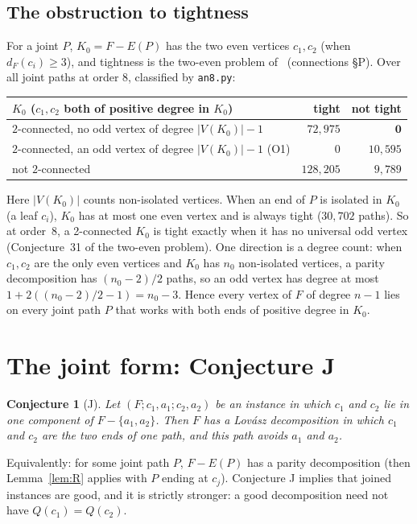 \documentclass[11pt]{amsart}
\newtheorem{conjecture}[theorem]{Conjecture}
\theoremstyle{definition}
\begin{document}
\subsection*{The obstruction to tightness}
For a joint $P$, $K_0=F-E(P)$ has the two even vertices $c_1,c_2$ (when $d_F(c_i)\ge3$), and tightness is
the two-even problem of~\cite{EP} (connections \S P). Over all joint paths at order $8$, classified by
\texttt{an8.py}:
\begin{center}\footnotesize
\begin{tabular}{@{}lrr@{}}
\toprule
$K_0$ ($c_1,c_2$ both of positive degree in $K_0$) & tight & not tight\\
\midrule
$2$-connected, no odd vertex of degree $|V(K_0)|-1$ & $72{,}975$ & $\mathbf 0$\\
$2$-connected, an odd vertex of degree $|V(K_0)|-1$ (O1) & $0$ & $10{,}595$\\
not $2$-connected & $128{,}205$ & $9{,}789$\\
\bottomrule
\end{tabular}
\end{center}
Here $|V(K_0)|$ counts non-isolated vertices. When an end of $P$ is isolated in $K_0$ (a leaf $c_i$),
$K_0$ has at most one even vertex and is always tight ($30{,}702$ paths). So at order~$8$, a 2-connected $K_0$ is tight exactly
when it has no universal odd vertex (Conjecture~31 of the two-even problem). One direction is a degree
count: when $c_1,c_2$ are the only even vertices and $K_0$ has $n_0$ non-isolated vertices, a parity
decomposition has $(n_0-2)/2$ paths, so an odd vertex has degree at most $1+2((n_0-2)/2-1)=n_0-3$.
Hence every vertex of $F$ of degree $n-1$ lies on every joint path $P$ that works with both ends of
positive degree in $K_0$.

\section{The joint form: Conjecture J}\label{sec:J}

\begin{conjecture}[J]\label{conj:J}
Let $(F;c_1,a_1;c_2,a_2)$ be an instance in which $c_1$ and $c_2$ lie in one component of
$F-\{a_1,a_2\}$. Then $F$ has a Lov\'asz decomposition in which $c_1$ and $c_2$ are the two ends of
one path, and this path avoids $a_1$ and $a_2$.
\end{conjecture}

Equivalently: for some joint path $P$, $F-E(P)$ has a parity decomposition (then
Lemma~\ref{lem:R} applies with $P$ ending at $c_j$). Conjecture J implies that joined instances are good, and it is strictly
stronger: a good decomposition need not have $Q(c_1)=Q(c_2)$.
\end{document}
